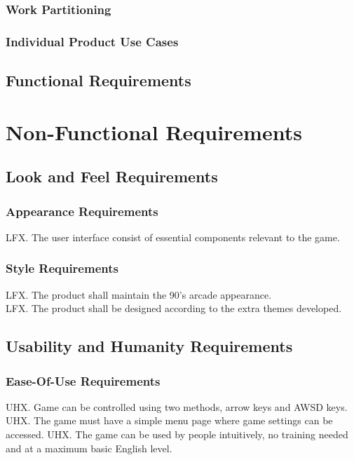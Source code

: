 \documentclass{article}
\begin{document}
\subsubsection{Work Partitioning}

\subsubsection{Individual Product Use Cases}

\subsection{Functional Requirements}






\section{Non-Functional Requirements}
    \subsection{Look and Feel Requirements}
        \subsubsection{Appearance Requirements}
        LFX. The user interface consist of essential components relevant to the game.\\
        \subsubsection{Style Requirements} 
    	LFX. The product shall maintain the 90's arcade appearance.\\
    	LFX. The product shall be designed according to the extra themes developed.
   
\subsection{Usability and Humanity Requirements}
    \subsubsection{Ease-Of-Use Requirements}
    UHX. Game can be controlled using two methods, arrow keys and AWSD keys.
    UHX. The game must have a simple menu page where game settings can be accessed.
    UHX. The game can be used by people intuitively, no training needed and at a maximum basic English level.
    
\end{document}
